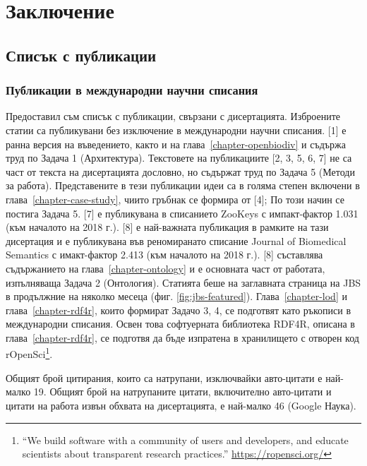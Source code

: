 \chapter*{Заключение}
\label{chapter:summary}

\section*{Списък с публикации}

\subsection*{Публикации в международни научни списания}

Предоставил съм списък с публикации, свързани с дисертацията. Изброените статии са публикувани без изключение в международни научни списания. [1] е ранна версия на въведението, както и на глава~\ref{chapter-openbiodiv} и съдържа труд по Задача 1 (Архитектура). Текстовете на публикациите [2, 3, 5, 6, 7] не са част от текста на дисертацията дословно, но съдържат труд по Задача 5 (Методи за работа). Представените в тези публикации идеи са в голяма степен включени в глава~\ref{chapter-case-study}, чиито гръбнак се формира от [4]; По този начин се постига Задача 5. [7] е публикувана в списанието ZooKeys с импакт-фактор 1.031 (към началото на 2018 г.). [8] е най-важната публикация в рамките на тази дисертация и е публикувана във реномиранато списание Journal of Biomedical Semantics с имакт-фактор 2.413 (към началото на 2018 г.). [8] съставлява съдържанието на глава~\ref{chapter-ontology} и е основната част от работата, изпълняваща Задача 2 (Онтология). Статията беше на заглавната страница на JBS в продължние на няколко месеца (фиг. \ref{fig:jbs-featured}). Глава~\ref{chapter-lod} и глава~\ref{chapter-rdf4r}, които формират Задачо 3, 4, се подготвят като ръкописи в международни списания. Освен това софтуерната библиотека RDF4R, описана в глава~\ref{chapter-rdf4r}, се подготвя да бъде изпратена в хранилището с отворен код rOpenSci\footnote{``We build software with a community of users and developers, and educate scientists about transparent research practices.'' \url{https://ropensci.org/}}.

Общият брой цитирания, които са натрупани, изключвайки авто-цитати е най-малко 19. Общият брой на натрупаните цитати, включително авто-цитати и цитати на работа извън обхвата на дисертацията, е най-малко 46 (Google Наука).

